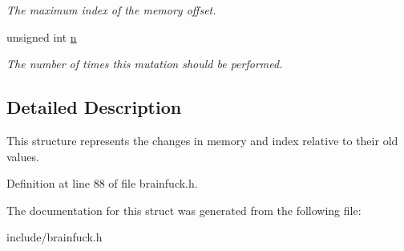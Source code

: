 \begin{DoxyCompactItemize}
\begin{DoxyCompactList}\small\item\em The maximum index of the memory offset. \end{DoxyCompactList}\item 
\hypertarget{structBrainfuckInstruction_1_1BrainfuckArgument_1_1BrainfuckMutation_a3d57087ce6b57e626f37eb651b9657fd}{}unsigned int \hyperlink{structBrainfuckInstruction_1_1BrainfuckArgument_1_1BrainfuckMutation_a3d57087ce6b57e626f37eb651b9657fd}{n}\label{structBrainfuckInstruction_1_1BrainfuckArgument_1_1BrainfuckMutation_a3d57087ce6b57e626f37eb651b9657fd}

\begin{DoxyCompactList}\small\item\em The number of times this mutation should be performed. \end{DoxyCompactList}\end{DoxyCompactItemize}


\subsection{Detailed Description}
This structure represents the changes in memory and index relative to their old values. 

Definition at line 88 of file brainfuck.\+h.



The documentation for this struct was generated from the following file\+:\begin{DoxyCompactItemize}
\item 
include/brainfuck.\+h\end{DoxyCompactItemize}
